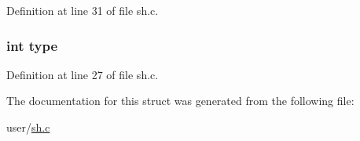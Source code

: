 Definition at line 31 of file sh.\-c.

\hypertarget{structredircmd_ac765329451135abec74c45e1897abf26}{
\subsubsection[{type}]{\setlength{\rightskip}{0pt plus 5cm}int type}}\label{structredircmd_ac765329451135abec74c45e1897abf26}


Definition at line 27 of file sh.\-c.



The documentation for this struct was generated from the following file\-:\begin{DoxyCompactItemize}
\item 
user/\hyperlink{sh_8c}{sh.\-c}\end{DoxyCompactItemize}
